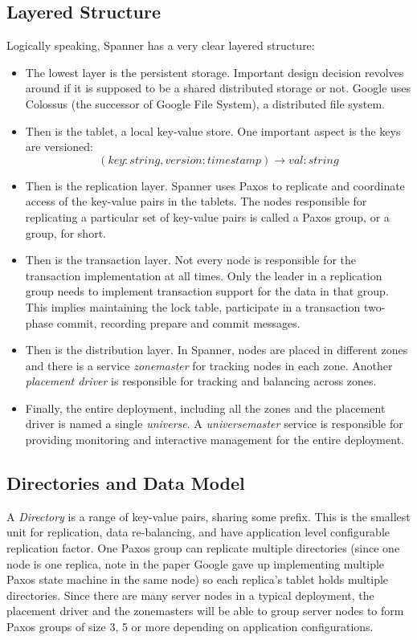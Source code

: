 \subsection{Layered Structure}
Logically speaking, Spanner has a very clear layered structure:
\begin{itemize}
   \item The lowest layer is the persistent storage. Important design decision
   revolves around if it is supposed to be a shared distributed storage or not.
   Google uses Colossus (the successor of Google File System), a distributed
   file system.

   \item Then is the tablet, a local key-value store. One important aspect is the
    keys are versioned:
    \[
       (key:string, version:timestamp) \rightarrow val: string
    \]

    \item Then is the replication layer. Spanner uses Paxos to replicate and coordinate access of the key-value pairs in the tablets. The nodes
    responsible for replicating a particular set of key-value pairs is
    called a Paxos group, or a group, for short.

    \item Then is the transaction layer. Not every node is responsible for
    the transaction implementation at all times. Only the leader in a
    replication group needs to implement transaction support for the data in
    that group. This implies maintaining the lock table, participate in a
    transaction two-phase commit, recording prepare and commit messages.

    \item Then is the distribution layer. In Spanner, nodes are placed in
    different zones and there is a service \textit{zonemaster} for tracking nodes in each zone. Another \textit{placement driver} is responsible for
    tracking and balancing across zones.

    \item Finally, the entire deployment, including all the zones and the
    placement driver is named a single \textit{universe}. A \textit{universemaster} service is responsible for providing monitoring and
    interactive management for the entire deployment.
\end{itemize}

\subsection{Directories and Data Model}
A \textit{Directory} is a range of key-value pairs, sharing some prefix. This
is the smallest unit for replication, data re-balancing, and have application
level configurable replication factor. One Paxos group can replicate multiple
directories (since one node is one replica, note in the paper Google gave up
implementing multiple Paxos state machine in the same node) so each replica's
tablet holds multiple directories. Since there are many server nodes in a
typical deployment, the placement driver and the zonemasters will be able to
group server nodes to form Paxos groups of size 3, 5 or more depending on
application configurations.

